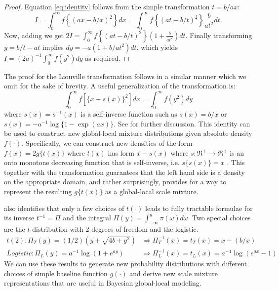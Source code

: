 \documentclass[lineno]{biometrika}
\begin{document}
\begin{proof}
Equation \eqref{eq:identity} follows from the simple transformation $t = b/ax$: 
\begin{equation*}
  I = \int_{0}^{\infty} f \left\{(ax - b/x)^2 \right\} dx = \int_{0}^{\infty} f \left\{(at - b/t)^2 \right\} \frac{b}{at^2} dt.
\end{equation*}
Now, adding we get $2 I = \int_{0}^{\infty} f \left\{(at - b/t)^2 \right\} \left( 1+\frac{b}{at^2} \right) dt$. Finally transforming $y = b/t - at$ implies $dy = -a (1+b/at^2) dt$, which yields $I = (2a)^{-1} \int_{0}^{\infty} f(y^2) dy$ as required. 
\end{proof}
The proof for the Liouville transformation follows in a similar manner which we omit for the sake of brevity. A useful generalization of the \CS transformation is: 
\begin{equation}
  \int_0^\infty f \left[ \{x-s(x)\}^2 \right] dx = \int_0^\infty f( y^2 ) dy \label{eq:gen}
\end{equation}
where $s(x)=s^{-1}(x)$ is a self-inverse function such as $s(x) = b/x$ or $s(x) = -a^{-1}\log\{1-\exp(a x)\}$. See \citet{amdeberhan2010cauchy} for further discussion. %
This identity can be used to construct new global-local mixture distributions given absolute density $f(\cdot)$. Specifically, we can construct new densities of the form $f(x) = 2g\{ t(x) \}$ where $t(x)$ has form $x-s(x)$ where $s : \Re^+ \to \Re^+$ is an onto monotone decreasing function that is self-inverse, i.e. $s\{ s(x)\} = x$ \citep{jones2014generating}. This together with the \CS transformation guarantees that the left hand side is a density on the appropriate domain, and rather surprisingly, provides for a way to represent the resulting $g\{t(x)\}$ as a global-local scale mixture. 

\citet{jones2014generating} also identifies that only a few choices of $t(\cdot)$ leads to fully tractable formulae for its inverse $t^{-1}= \Pi$ and the integral $\Pi(y) = \int_{-\infty}^{y} \pi(\omega) d\omega$. Two special choices are the $t$ distribution with 2 degrees of freedom and the logistic. 
\begin{align*}
t(2): \Pi_{T}(y) = (1/2)(y+\sqrt{4b+y^2}) & \Rightarrow \Pi_T^{-1}(x) = t_T(x) = x - (b/x) \\
Logistic: \Pi_{L}(y) = a^{-1} \log(1+e^{ay}) & \Rightarrow \Pi_L^{-1}(x) = t_L(x) = a^{-1} \log(e^{ax}-1) 
\end{align*}
We can use these results to generate new probability distributions with different choices of simple baseline function $g(\cdot)$ and derive new scale mixture representations that are useful in Bayesian global-local modeling. 
\end{document}
